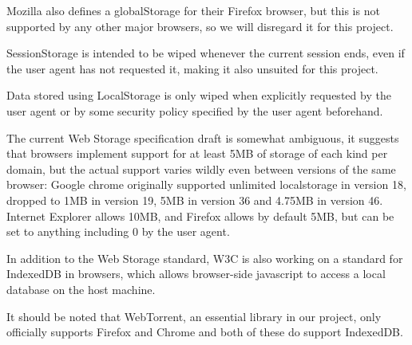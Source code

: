Mozilla also defines a globalStorage for their Firefox browser, 
but this is not supported by any other major browsers, so we will disregard it for this project.

SessionStorage is intended to be wiped whenever the current session ends, 
even if the user agent has not requested it, making it also unsuited for this project.

Data stored using LocalStorage is only wiped when explicitly requested by the user agent or 
by some security policy specified by the user agent beforehand.
\newline

The current Web Storage specification draft is somewhat ambiguous, 
it suggests that browsers implement support for at least 5MB of storage of each kind per domain,
but the actual support varies wildly even between versions of the same browser:
Google chrome originally supported unlimited localstorage in version 18, dropped to 1MB in version 19, 
5MB in version 36 and 4.75MB in version 46. 
Internet Explorer allows 10MB, 
and Firefox allows by default 5MB, but can be set to anything including 0 by the user agent.
\newline

In addition to the Web Storage standard, W3C is also working on a standard for IndexedDB in browsers, 
which allows browser-side javascript to access a local database on the host machine.

It should be noted that WebTorrent, 
an essential library in our project, 
only officially supports Firefox and Chrome 
and both of these do support IndexedDB.
\newline
